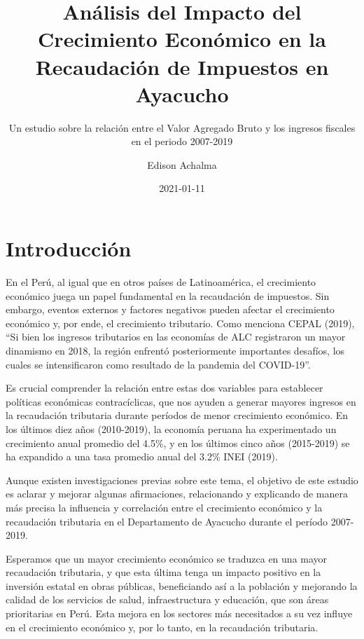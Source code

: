 \documentclass[
  letterpaper,
  DIV=11,
  numbers=noendperiod]{scrartcl}
\title{Análisis del Impacto del Crecimiento Económico en la Recaudación
de Impuestos en Ayacucho}
\subtitle{Un estudio sobre la relación entre el Valor Agregado Bruto y
los ingresos fiscales en el periodo 2007-2019}
\author{Edison Achalma}
\date{2021-01-11}
\begin{document}
\maketitle
\ifdefined\Shaded\renewenvironment{Shaded}{\begin{tcolorbox}[sharp corners, boxrule=0pt, borderline west={3pt}{0pt}{shadecolor}, breakable, enhanced, frame hidden, interior hidden]}{\end{tcolorbox}}\fi

\hypertarget{sec-introducciuxf3n}{%
\section*{Introducción}\label{sec-introducciuxf3n}}

En el Perú, al igual que en otros países de Latinoamérica, el
crecimiento económico juega un papel fundamental en la recaudación de
impuestos. Sin embargo, eventos externos y factores negativos pueden
afectar el crecimiento económico y, por ende, el crecimiento tributario.
Como menciona CEPAL (2019), ``Si bien los ingresos tributarios en las
economías de ALC registraron un mayor dinamismo en 2018, la región
enfrentó posteriormente importantes desafíos, los cuales se
intensificaron como resultado de la pandemia del COVID-19''.

Es crucial comprender la relación entre estas dos variables para
establecer políticas económicas contracíclicas, que nos ayuden a generar
mayores ingresos en la recaudación tributaria durante períodos de menor
crecimiento económico. En los últimos diez años (2010-2019), la economía
peruana ha experimentado un crecimiento anual promedio del 4.5\%, y en
los últimos cinco años (2015-2019) se ha expandido a una tasa promedio
anual del 3.2\% INEI (2019).

Aunque existen investigaciones previas sobre este tema, el objetivo de
este estudio es aclarar y mejorar algunas afirmaciones, relacionando y
explicando de manera más precisa la influencia y correlación entre el
crecimiento económico y la recaudación tributaria en el Departamento de
Ayacucho durante el período 2007-2019.

Esperamos que un mayor crecimiento económico se traduzca en una mayor
recaudación tributaria, y que esta última tenga un impacto positivo en
la inversión estatal en obras públicas, beneficiando así a la población
y mejorando la calidad de los servicios de salud, infraestructura y
educación, que son áreas prioritarias en Perú. Esta mejora en los
sectores más necesitados a su vez influye en el crecimiento económico y,
por lo tanto, en la recaudación tributaria.
\end{document}
